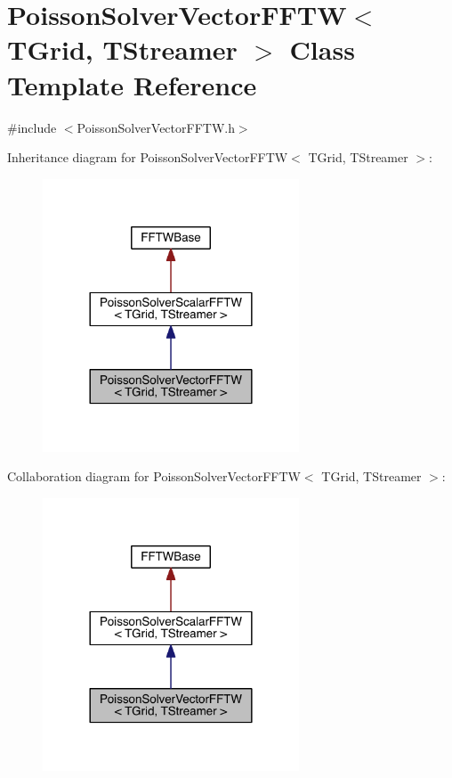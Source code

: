 \hypertarget{class_poisson_solver_vector_f_f_t_w}{}\section{Poisson\+Solver\+Vector\+F\+F\+T\+W$<$ T\+Grid, T\+Streamer $>$ Class Template Reference}
\label{class_poisson_solver_vector_f_f_t_w}


{\ttfamily \#include $<$Poisson\+Solver\+Vector\+F\+F\+T\+W.\+h$>$}



Inheritance diagram for Poisson\+Solver\+Vector\+F\+F\+T\+W$<$ T\+Grid, T\+Streamer $>$\+:\nopagebreak
\begin{figure}[H]
\begin{center}
\leavevmode
\includegraphics[width=216pt]{d7/d63/class_poisson_solver_vector_f_f_t_w__inherit__graph}
\end{center}
\end{figure}


Collaboration diagram for Poisson\+Solver\+Vector\+F\+F\+T\+W$<$ T\+Grid, T\+Streamer $>$\+:\nopagebreak
\begin{figure}[H]
\begin{center}
\leavevmode
\includegraphics[width=216pt]{d4/dae/class_poisson_solver_vector_f_f_t_w__coll__graph}
\end{center}
\end{figure}

